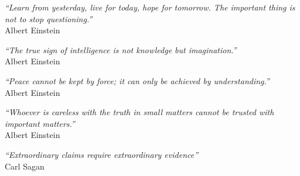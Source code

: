 
\begin{epigrafe}
    \vspace*{\fill}
	\begin{flushright}
		\textit{``Learn from yesterday, live for today, hope for tomorrow. The important thing is not to stop questioning.''}\\	Albert Einstein		
	\end{flushright}
	\begin{flushright}
		\textit{``The true sign of intelligence is not knowledge but imagination.''}\\	Albert Einstein		
	\end{flushright}
	\begin{flushright}
		\textit{``Peace cannot be kept by force; it can only be achieved by understanding.''}\\	Albert Einstein		
	\end{flushright}
	\begin{flushright}
		\textit{``Whoever is careless with the truth in small matters cannot be trusted with important matters.''}\\	Albert Einstein		
	\end{flushright}		
	\begin{flushright}
		\textit{``Extraordinary claims require extraordinary evidence''}\\
		Carl Sagan
	\end{flushright}
\end{epigrafe}
